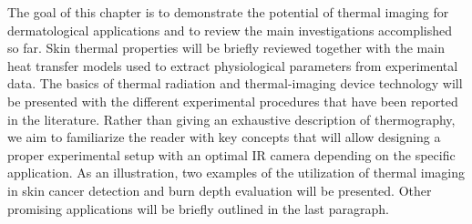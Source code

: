 The goal of this chapter is to demonstrate the potential of thermal imaging for
dermatological applications and to review the main investigations accomplished so far.
Skin thermal properties will be briefly reviewed together with the main heat transfer
models used to extract physiological parameters from experimental data. The basics of
thermal radiation and thermal-imaging device technology will be presented with the
different experimental procedures that have been reported in the literature. Rather
than giving an exhaustive description of thermography, we aim to familiarize the
reader with key concepts that will allow designing a proper experimental setup with an
optimal IR camera depending on the specific application. As an illustration, two examples
of the utilization of thermal imaging in skin cancer detection and burn depth evaluation
will be presented. Other promising applications will be briefly outlined in the last
paragraph.
